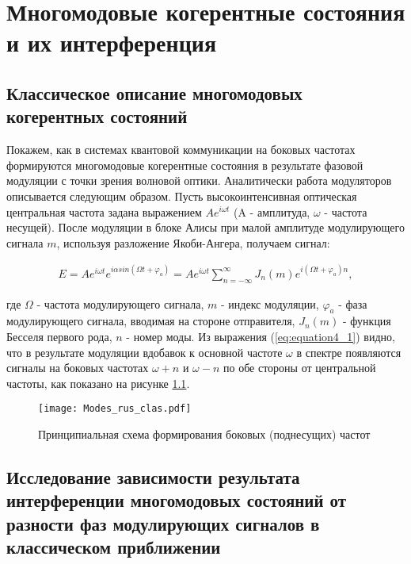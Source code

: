 \chapter{Многомодовые когерентные состояния и их интерференция}  \label{ch:ch4}

\section{Классическое описание многомодовых когерентных состояний} \label{sec:ch4/sec1}

Покажем, как в системах квантовой коммуникации на боковых частотах формируются многомодовые когерентные состояния в результате фазовой модуляции с точки зрения волновой оптики. Аналитически работа модуляторов описывается следующим образом. Пусть высокоинтенсивная оптическая центральная частота задана выражением $Ae^{i \omega t}$ (A - амплитуда, $\omega$ - частота несущей). После модуляции в блоке Алисы при малой амплитуде модулирующего сигнала $m$, используя разложение Якоби-Ангера, получаем сигнал: 

\begin{equation}
	\begin{aligned}
	\label{eq:equation4_1}
		E = Ae^{i \omega t}e^{i \alpha sin(\Omega t+ \varphi_a)} = Ae^{i \omega t} \sum_{n=-\infty}^\infty J_{n}(m) e^{i (\Omega t+ \varphi_a) n},
	\end{aligned}
\end{equation}

где  $\Omega$ - частота модулирующего сигнала, $m$ - индекс модуляции, $\varphi_a$ - фаза модулирующего сигнала, вводимая на стороне отправителя, $J_{n}(m)$ - функция Бесселя первого рода, $n$ - номер моды. Из выражения (\ref{eq:equation4_1}) видно, что в результате модуляции вдобавок к основной частоте $\omega$ в спектре появляются сигналы на боковых частотах  $\omega + n$  и  $\omega - n$ по обе стороны от центральной частоты, как показано на рисунке \ref{fig:multimodes_clas}. 

\begin{figure}[ht]
  \centering
  \texttt{[image: Modes\_rus\_clas.pdf]}
  \caption{Принципиальная схема формирования боковых (поднесущих) частот}
  \label{fig:multimodes_clas}
\end{figure}

\section{Исследование зависимости результата интерференции многомодовых состояний от разности фаз модулирующих сигналов в классическом приближении} \label{sec:ch4/sec2}

